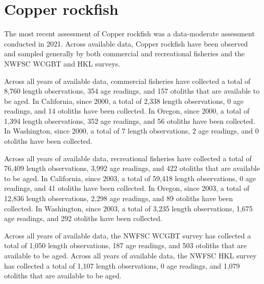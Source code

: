 \documentclass[11pt,
  english,
  letterpaper,
]{article}
\begin{document}

\hypertarget{copper-rockfish}{%
\section{Copper rockfish}\label{copper-rockfish}}

\leavevmode\tagmcend\tagstructend


The most recent assessment of Copper rockfish was a data-moderate assessment conducted in 2021. Across available data, Copper rockfish have been observed and sampled generally by both commercial and recreational fisheries and the NWFSC WCGBT and HKL surveys.

\leavevmode\tagmcend\tagstructend\par


Across all years of available data, commercial fisheries have collected a total of 8,760 length observations, 354 age readings, and 157 otoliths that are available to be aged. In California, since 2000, a total of 2,338 length observations, 0 age readings, and 14 otoliths have been collected. In Oregon, since 2000, a total of 1,394 length observations, 352 age readings, and 56 otoliths have been collected. In Washington, since 2000, a total of 7 length observations, 2 age readings, and 0 otoliths have been collected.

\leavevmode\tagmcend\tagstructend\par


Across all years of available data, recreational fisheries have collected a total of 76,409 length observations, 3,992 age readings, and 422 otoliths that are available to be aged. In California, since 2003, a total of 59,418 length observations, 0 age readings, and 41 otoliths have been collected. In Oregon, since 2003, a total of 12,836 length observations, 2,298 age readings, and 89 otoliths have been collected. In Washington, since 2003, a total of 3,235 length observations, 1,675 age readings, and 292 otoliths have been collected.

\leavevmode\tagmcend\tagstructend\par


Across all years of available data, the NWFSC WCGBT survey has collected a total of 1,050 length observations, 187 age readings, and 503 otoliths that are available to be aged. Across all years of available data, the NWFSC HKL survey has collected a total of 1,107 length observations, 0 age readings, and 1,079 otoliths that are available to be aged.
\end{document}

